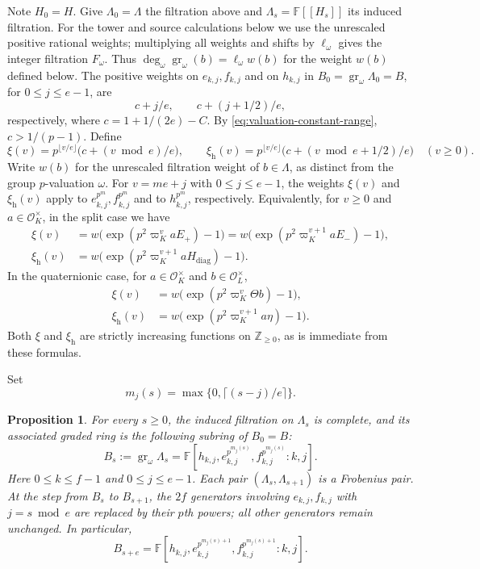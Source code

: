 \documentclass[11pt]{article}
\numberwithin{equation}{section}
\newtheorem{proposition}[theorem]{Proposition}
\theoremstyle{definition}
\theoremstyle{remark}
\newcommand{\F}{\mathbb F}
\newcommand{\Z}{\mathbb Z}
\newcommand{\cO}{\mathcal O}
\DeclareMathOperator{\gr}{gr}
\begin{document}
Note $H_0=H$. Give $\Lambda_0=\Lambda$ the filtration above
and $\Lambda_s=\F[[H_s]]$ its induced filtration.
For the tower and source calculations below we use the unrescaled
positive rational weights; multiplying all weights and shifts by
$\ell_\omega$ gives the integer filtration $F_\omega$. Thus
$\deg_\omega\gr_\omega(b)=\ell_\omega w(b)$ for the weight $w(b)$
defined below.
The positive weights on $e_{k,j},f_{k,j}$ and on $h_{k,j}$
in $B_0=\gr_\omega\Lambda_0=B$, for $0\leq j\leq e-1$, are
\[
 c+j/e,\qquad c+(j+1/2)/e,
\]
respectively, where $c=1+1/(2e)-C$.
By \eqref{eq:valuation-constant-range}, $c>1/(p-1)$. Define
\[
 \xi(v)=p^{\lfloor v/e\rfloor}
       \bigl(c+(v\bmod e)/e\bigr),\qquad
 \xi_{\mathrm{h}}(v)=p^{\lfloor v/e\rfloor}
       \bigl(c+(v\bmod e+1/2)/e\bigr)
       \quad(v\geq0).
\]
Write $w(b)$ for the unrescaled filtration weight of $b\in\Lambda$,
as distinct from the group $p$-valuation $\omega$.
For $v=me+j$ with $0\leq j\leq e-1$, the weights $\xi(v)$ and
$\xi_{\mathrm h}(v)$ apply to $e_{k,j}^{p^m},f_{k,j}^{p^m}$ and
to $h_{k,j}^{p^m}$, respectively. Equivalently, for $v\geq0$ and
$a\in\cO_K^\times$, in the split case we have
\[
 \begin{aligned}
 \xi(v)&=w\bigl(\exp(p^2\varpi_K^v aE_+)-1\bigr)
       =w\bigl(\exp(p^2\varpi_K^{v+1}aE_-)-1\bigr),\\
 \xi_{\mathrm h}(v)
 &=w\bigl(\exp(p^2\varpi_K^{v+1}aH_{\mathrm{diag}})-1\bigr).
 \end{aligned}
\]
In the quaternionic case, for $a\in\cO_K^\times$ and
$b\in\cO_L^\times$,
\[
 \begin{aligned}
 \xi(v)&=w\bigl(\exp(p^2\varpi_K^v\Theta b)-1\bigr),\\
 \xi_{\mathrm h}(v)
 &=w\bigl(\exp(p^2\varpi_K^{v+1}a\eta)-1\bigr).
 \end{aligned}
\]
Both $\xi$ and $\xi_{\mathrm h}$
are strictly increasing functions on $\Z_{\geq0}$, as is immediate
from these formulas.

Set
\[
 m_j(s)=\max\{0,\lceil(s-j)/e\rceil\}.
\]
\begin{proposition}\label{prop:casimir-tower-graded}
For every $s\geq0$, the induced filtration on $\Lambda_s$ is complete,
and its associated graded ring is the following subring
of $B_0=B$:
\begin{equation}\label{eq:casimir-tower-graded}
 B_s:=\gr_\omega\Lambda_s
 =\F[h_{k,j},e_{k,j}^{p^{m_j(s)}},f_{k,j}^{p^{m_j(s)}}:k,j].
\end{equation}
Here $0\leq k\leq f-1$ and $0\leq j\leq e-1$.
Each pair $(\Lambda_s,\Lambda_{s+1})$ is a Frobenius pair.
At the step from $B_s$ to $B_{s+1}$, the $2f$ generators involving
$e_{k,j},f_{k,j}$ with $j=s\bmod e$ are replaced by their $p$th
powers; all other generators remain unchanged.
In particular,
\begin{equation}\label{eq:casimir-full-cycle}
 B_{s+e}
 =\F[h_{k,j},e_{k,j}^{p^{m_j(s)+1}},f_{k,j}^{p^{m_j(s)+1}}:k,j].
\end{equation}
\end{proposition}
\end{document}

